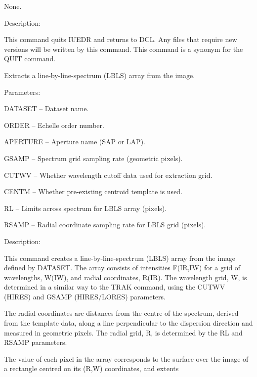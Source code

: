 \begin {description}
\begin {description}
\begin {description}
\item None.
\end {description}

\item Description:

This command quits IUEDR and returns to DCL.
Any files that require new versions will be written by this
command.
This command is a synonym for the QUIT command.
\end {description}

\item [LBLS]
Extracts a line-by-line-spectrum (LBLS) array from the 
image.

\begin {description}
\item Parameters:

\begin {description}
\item DATASET -- Dataset name.
\item ORDER -- Echelle order number.
\item APERTURE -- Aperture name (SAP or LAP).
\item GSAMP -- Spectrum grid sampling rate (geometric pixels).
\item CUTWV -- Whether wavelength cutoff data used for extraction grid.
\item CENTM -- Whether pre-existing centroid template is used.
\item RL -- Limits across spectrum for LBLS array (pixels).
\item RSAMP -- Radial coordinate sampling rate for LBLS grid (pixels).
\end {description}

\item Description:

This command creates a line-by-line-spectrum (LBLS) array from the
image defined by DATASET.
The array consists of intensities F(IR,IW) for a grid of wavelengths,
W(IW), and radial coordinates, R(IR).
The wavelength grid, W, is determined in a similar way to the TRAK command,
using the CUTWV (HIRES) and GSAMP (HIRES/LORES) parameters.

The radial coordinates are distances from the centre of the spectrum,
derived from the template data,
along a line perpendicular to the dispersion direction and
measured in geometric pixels.
The radial grid, R, is determined by the RL and RSAMP parameters.

The value of each pixel in the array corresponds to the surface
over the image of a rectangle centred on its (R,W) coordinates,
and extents


\end{description}
\end{description}
